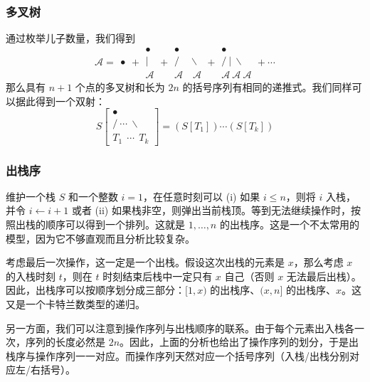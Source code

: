 \subsubsection{多叉树}
    通过枚举儿子数量，我们得到
    $$
    \mathcal A=\begin{array}{c}\bullet\end{array}+\begin{array}{c}
        \bullet \\
        |  \\
        \mathcal A
        \end{array}
        +\begin{array}{c}
        \bullet \\
        / \quad \backslash \\
        \mathcal A \quad \mathcal A
        \end{array}
        +\begin{array}{c}
            \bullet \\
            / \  |\  \backslash \\
            \mathcal A \  \mathcal A \ \mathcal A
            \end{array}
        +\cdots
    $$
    那么具有 $n+1$ 个点的多叉树和长为 $2n$ 的括号序列有相同的递推式。我们同样可以据此得到一个双射：
    $$
    S\left[\begin{array}{c}
        \mathbf{\bullet} \\
        / \ \cdots\  \backslash \\
        T_1\ \ \cdots \ \  T_k
        \end{array}\right]=(S[T_1])\cdots(S[T_k])
    $$

\subsubsection{出栈序}
    维护一个栈 $S$ 和一个整数 $i=1$，在任意时刻可以 (i) 如果 $i\le n$，则将 $i$ 入栈，并令 $i\gets i+1$ 或者 (ii) 如果栈非空，则弹出当前栈顶。等到无法继续操作时，按照出栈的顺序可以得到一个排列。这就是 $1,\ldots,n$ 的出栈序。这是一个不太常用的模型，因为它不够直观而且分析比较复杂。
    
    考虑最后一次操作，这一定是一个出栈。假设这次出栈的元素是 $x$，那么考虑 $x$ 的入栈时刻 $t$，则在 $t$ 时刻结束后栈中一定只有 $x$ 自己（否则 $x$ 无法最后出栈）。因此，出栈序可以按顺序划分成三部分：$[1,x)$ 的出栈序、$(x,n]$ 的出栈序、$x$。这又是一个卡特兰数类型的递归。

    另一方面，我们可以注意到操作序列与出栈顺序的联系。由于每个元素出入栈各一次，序列的长度必然是 $2n$。因此，上面的分析也给出了操作序列的划分，于是出栈序与操作序列一一对应。而操作序列天然对应一个括号序列（入栈/出栈分别对应左/右括号）。

